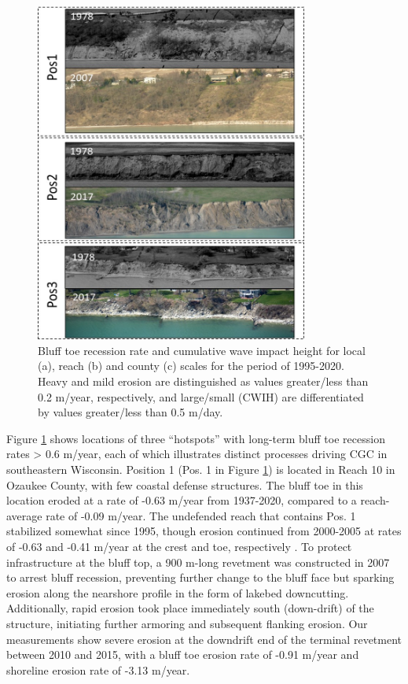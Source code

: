 \begin{figure}[htbp] 
\centering
\includegraphics[width=0.8\textwidth]{chapter2/resources/figure2-8.jpg}
\caption{Bluff toe recession rate and cumulative wave impact height for local
(a), reach (b) and county (c) scales for the period of 1995-2020. Heavy and mild
erosion are distinguished as values greater/less than 0.2 m/year, respectively,
and large/small (CWIH) are differentiated by values greater/less than 0.5
m/day.} 
\label{fig:fig2.8} 
\end{figure} 

Figure \ref{fig:fig2.8} shows locations of three “hotspots” with long-term bluff
toe recession rates > 0.6 m/year, each of which illustrates distinct processes
driving CGC in southeastern Wisconsin.  Position 1 (Pos. 1 in Figure
\ref{fig:fig2.8}) is located in Reach 10 in Ozaukee County, with few coastal
defense structures. The bluff toe in this location eroded at a rate of -0.63
m/year from 1937-2020, compared to a reach-average rate of -0.09 m/year.  The
undefended reach that contains Pos. 1 stabilized somewhat since 1995, though
erosion continued from 2000-2005 at rates of -0.63 and -0.41 m/year at the crest
and toe, respectively \citep{lin_field_2014}. To protect infrastructure at the
bluff top, a 900 m-long revetment was constructed in 2007 to arrest bluff
recession, preventing further change to the bluff face but sparking erosion
along the nearshore profile in the form of lakebed downcutting. Additionally,
rapid erosion took place immediately south (down-drift) of the structure,
initiating further armoring  and subsequent flanking erosion. Our measurements
show severe erosion at the downdrift end of the terminal revetment between 2010
and 2015, with a bluff toe erosion rate of -0.91 m/year and shoreline erosion
rate of -3.13 m/year.

